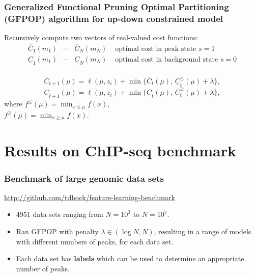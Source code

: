 \documentclass{beamer}
\begin{document}
\begin{frame}
  \frametitle{Generalized Functional Pruning Optimal Partitioning
    (GFPOP) algorithm for up-down constrained model}
Recursively compute two vectors of real-valued cost functions:
$$
\begin{array}{cccl}
  \overline C_{1}(m_1) & \cdots & \overline C_N(m_{N})& \text{ optimal cost in peak state $s=1$}\\
  \underline C_{1}(m_1) & \cdots & \underline C_N(m_{N})& \text{ optimal cost in background state $s=0$}\\
\end{array}
$$
\begin{minipage}{0.65\linewidth}
  $$\overline C_{t+1}(\mu) = \ell(\mu, z_i) + \min\{
  \overline C_t(\mu),\, 
  \underline C_t^\leq(\mu)+\lambda
\},$$
  $$\underline C_{t+1}(\mu) = \ell(\mu, z_i) + \min\{
  \underline C_t(\mu),\, 
  \overline C_t^\geq(\mu)+\lambda
\},$$
where $f^\leq(\mu) = \min_{x\leq\mu} f(x)$,\\
$f^\geq(\mu) = \min_{x\geq\mu} f(x)$.
\end{minipage}
\begin{minipage}{0.25\linewidth}
\end{minipage}
\end{frame}

\section{Results on ChIP-seq benchmark}

\begin{frame}
  \frametitle{Benchmark of large genomic data sets}

\url{http://github.com/tdhock/feature-learning-benchmark}

\begin{itemize}
\item 4951 data sets ranging from $N=10^3$ to $N=10^7$.
\item Ran GFPOP with penalty $\lambda\in(\log N, N)$, resulting in a
  range of models with different numbers of peaks, for each data set.
\item Each data set has \textbf{labels} which can be used to determine
  an appropriate number of peaks.
\end{itemize}
\end{frame}
\end{document}
